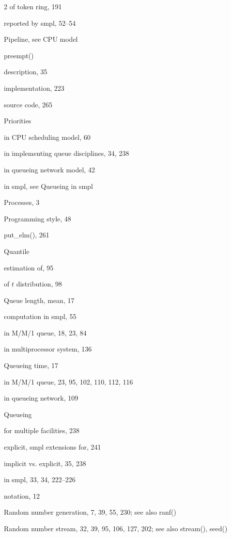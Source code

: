 \begin{multicols}{2}
\quad of token ring, 191\par
\quad reported by smpl, 52--54\par
\noindent Pipeline, see CPU model\par
\noindent preempt()\par
\quad description, 35\par
\quad implementation, 223\par
\quad source code, 265\par
\noindent Priorities\par
\quad in CPU scheduling model, 60\par
\quad in implementing queue disciplines, 34, 238\par
\quad in queueing network model, 42\par
\quad in smpl, see Queueing in smpl\par
\noindent Processes, 3\par
\noindent Programming style, 48\par
\noindent put\_elm(), 261\par
\noindent Quantile\par
\quad estimation of, 95\par
\quad of $t$ distribution, 98\par
\noindent Queue length, mean, 17\par
\quad computation in smpl, 55\par
\quad in M/M/1 queue, 18, 23, 84\par
\quad in multiprocessor system, 136\par
\noindent Queueing time, 17\par
\quad in M/M/1 queue, 23, 95, 102, 110, 112, 116\par
\quad in queueing network, 109\par
\noindent Queueing\par
\quad for multiple facilities, 238\par
\quad explicit, smpl extensions for, 241\par
\quad implicit vs. explicit, 35, 238\par
\quad in smpl, 33, 34, 222--226\par
\quad notation, 12\par
\noindent Random number generation, 7, 39, 55, 230; see also ranf()\par
\noindent Random number stream, 32, 39, 95, 106, 127, 202; see also stream(), seed()\par

\end{multicols}
